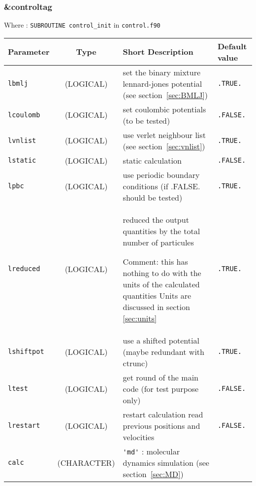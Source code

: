 \documentclass[a4paper]{article}
\begin{document}
\subsubsection{\&controltag }

Where : \verb?SUBROUTINE control_init? in \verb?control.f90?
\newline

\begin{longtable}{l|c|m{8cm}|m{2cm}}
\hline
\hline
Parameter        &  Type              &          Short Description                                                          & Default value \\
\hline
\hline
\rule[-0.75cm]{0cm}{1.5cm}
\verb?lbmlj?     & (LOGICAL)          &  set the binary mixture lennard-jones potential (see section~\ref{sec:BMLJ})        & \verb?.TRUE.?  \\
\hline
\rule[-0.75cm]{0cm}{1.5cm}
\verb?lcoulomb?  & (LOGICAL)          &  set coulombic potentials (to be tested)                                            & \verb?.FALSE.? \\
\hline
\rule[-0.75cm]{0cm}{1.5cm}
\verb?lvnlist?   & (LOGICAL)          &  use verlet neighbour list (see section~\ref{sec:vnlist})                           & \verb?.TRUE.?  \\
\hline
\rule[-0.75cm]{0cm}{1.5cm}
\verb?lstatic?   & (LOGICAL)          &  static calculation                                                                 & \verb?.FALSE.? \\
\hline
\rule[-0.75cm]{0cm}{1.5cm}
\verb?lpbc?      & (LOGICAL)          &  use periodic boundary conditions (if .FALSE. should be tested)                     & \verb?.TRUE.?  \\
\hline
\rule[-0.75cm]{0cm}{1.5cm}
\verb?lreduced?  & (LOGICAL)          &  \newline reduced the output quantities by the total number of particules \newline

                                         Comment: this has nothing to do with the units of the calculated quantities
					 Units are discussed in section \ref{sec:units} \newline                            & \verb?.TRUE.? \\ 
\hline
\rule[-0.75cm]{0cm}{1.5cm}
\verb?lshiftpot? & (LOGICAL)          &  use a shifted potential (maybe redundant with ctrunc)                              & \verb?.TRUE.? \\
\hline
\rule[-0.75cm]{0cm}{1.5cm}
\verb?ltest?     & (LOGICAL)          &  get round of the main code (for test purpose only)                                 & \verb?.FALSE.? \\
\hline
\rule[-0.75cm]{0cm}{1.5cm}
\verb?lrestart?   & (LOGICAL)         &  restart calculation read previous positions and velocities                         & \verb?.FALSE.? \\
\hline
\rule[-2.5cm]{0cm}{5cm}
\verb?calc?      & (CHARACTER)        & \newline \verb?'md'?  : molecular dynamics simulation (see section~\ref{sec:MD}) \newline


\end{longtable}
\end{document}
